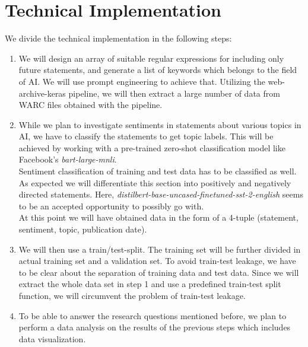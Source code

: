 \documentclass[11pt]{article}
\begin{document}
\section{Technical Implementation}
We divide the technical implementation in the following steps:

\begin{enumerate}
\item We will design an array of suitable regular expressions for including only future statements, and generate a list of keywords which belongs to the field of AI.
We will use prompt engineering to achieve that.
Utilizing the web-archive-keras pipeline, we will then extract a large number of data from WARC files obtained with the pipeline.

\item While we plan to investigate sentiments in statements about various topics in AI, we have to classify the statements to get topic labels.
This will be achieved by working with a pre-trained zero-shot classification model like Facebook’s \textit{bart-large-mnli}.
\\
Sentiment classification of training and test data has to be classified as well.
As expected we will differentiate this section into positively and negatively directed statements.
Here, \textit{distilbert-base-uncased-finetuned-sst-2-english} seems to be an accepted opportunity to possibly go with.
\\
At this point we will have obtained data in the form of a 4-tuple (statement, sentiment, topic, publication date).

\item We will then use a train/test-split.
The training set will be further divided in actual training set and a validation set.
To avoid train-test leakage, we have to be clear about the separation of training data and test data.
Since we will extract the whole data set in step 1 and use a predefined train-test split function, we will circumvent the problem of train-test leakage.

\item To be able to answer the research questions mentioned before, we plan to perform a data analysis on the results of the previous steps which includes data visualization.
\end{enumerate}
\end{document}
